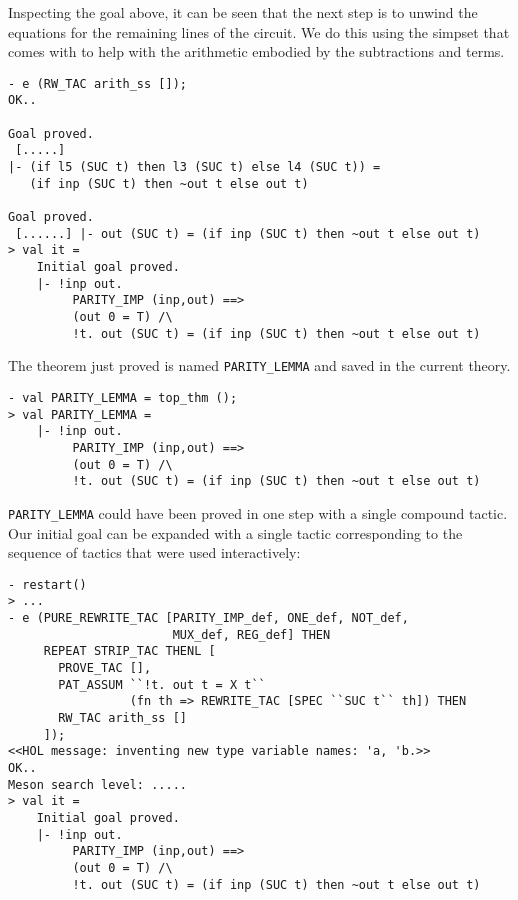 Inspecting the goal above, it can be seen that the next step is to
unwind the equations for the remaining lines of the circuit.  We do
this using the  simpset that comes with  to
help with the arithmetic embodied by the subtractions and 
terms.

\begin{session}
\begin{verbatim}
- e (RW_TAC arith_ss []);
OK..

Goal proved.
 [.....]
|- (if l5 (SUC t) then l3 (SUC t) else l4 (SUC t)) =
   (if inp (SUC t) then ~out t else out t)

Goal proved.
 [......] |- out (SUC t) = (if inp (SUC t) then ~out t else out t)
> val it =
    Initial goal proved.
    |- !inp out.
         PARITY_IMP (inp,out) ==>
         (out 0 = T) /\
         !t. out (SUC t) = (if inp (SUC t) then ~out t else out t)
\end{verbatim}
\end{session}

\noindent The theorem just proved is named
{\small\verb|PARITY_LEMMA|} and saved in the current theory.

\begin{session}
\begin{verbatim}
- val PARITY_LEMMA = top_thm ();
> val PARITY_LEMMA =
    |- !inp out.
         PARITY_IMP (inp,out) ==>
         (out 0 = T) /\
         !t. out (SUC t) = (if inp (SUC t) then ~out t else out t)
\end{verbatim}
\end{session}

{\small\verb|PARITY_LEMMA|} could have been proved in one step with a
single compound tactic.  Our initial goal can be expanded with a
single tactic corresponding to the sequence of tactics that were used
interactively:

\begin{session}
\begin{verbatim}
- restart()
> ...
- e (PURE_REWRITE_TAC [PARITY_IMP_def, ONE_def, NOT_def,
                       MUX_def, REG_def] THEN
     REPEAT STRIP_TAC THENL [
       PROVE_TAC [],
       PAT_ASSUM ``!t. out t = X t``
                 (fn th => REWRITE_TAC [SPEC ``SUC t`` th]) THEN
       RW_TAC arith_ss []
     ]);
<<HOL message: inventing new type variable names: 'a, 'b.>>
OK..
Meson search level: .....
> val it =
    Initial goal proved.
    |- !inp out.
         PARITY_IMP (inp,out) ==>
         (out 0 = T) /\
         !t. out (SUC t) = (if inp (SUC t) then ~out t else out t)
\end{verbatim}
\end{session}

